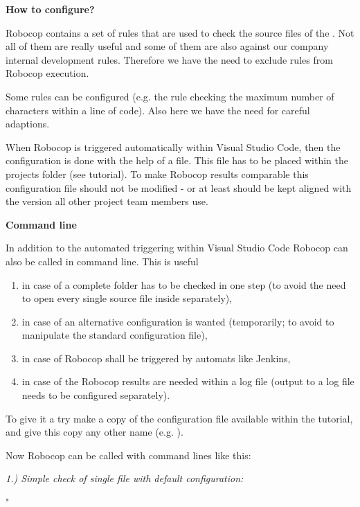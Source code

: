 \textbf{How to configure?}

Robocop contains a set of rules that are used to check the source files of the \rfw. Not all of them are really useful and some of them are also against
our company internal development rules. Therefore we have the need to exclude rules from Robocop execution.

Some rules can be configured (e.g. the rule checking the maximum number of characters within a line of code). Also here we have the need for careful adaptions.

When Robocop is triggered automatically within Visual Studio Code, then the configuration is done with the help of a  file. This file has to be placed
within the projects folder (see tutorial). To make Robocop results comparable this configuration file should not be modified - or at least should be kept aligned with
the version all other project team members use.

\newpage

\textbf{Command line}

In addition to the automated triggering within Visual Studio Code Robocop can also be called in command line. This is useful
\begin{enumerate}
   \item in case of a complete folder has to be checked in one step (to avoid the need to open every single source file inside separately),
   \item in case of an alternative configuration is wanted (temporarily; to avoid to manipulate the standard configuration file),
   \item in case of Robocop shall be triggered by automats like Jenkins,
   \item in case of the Robocop results are needed within a log file (output to a log file needs to be configured separately).
\end{enumerate}

To give it a try make a copy of the configuration file  available within the tutorial, and give this copy any other name (e.g. ).

Now Robocop can be called with command lines like this:

\vspace{2ex}

\textit{1.) Simple check of single file with default configuration:}

\begin{pythoncode}
"%
\end{pythoncode}

